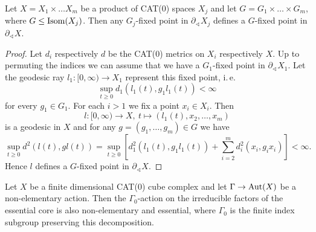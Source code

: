 \begin{lemma}[{\cite[Lemma~2.9]{MR3509968}}]
  \label{lem:2.9}
  Let \(X = X_1 \times \dots X_m\) be a product of CAT(0) spaces \(X_j\) and let \(G = G_1 \times \dots \times G_m\), where \(G \leq \operatorname{Isom}(X_j)\). Then any \(G_j\)-fixed point in \(\partial_\sphericalangle X_j\) defines a \(G\)-fixed point in \(\partial_\sphericalangle X\).
\end{lemma}

\begin{proof}
  Let \(d_i\) respectively \(d\) be the CAT(0) metrics on \(X_i\) respectively \(X\). Up to permuting the indices we can assume that we have a \(G_1\)-fixed point in \(\partial_\sphericalangle X_1\). Let the geodesic ray \(l_1\colon [0,\infty) \to X_1\) represent this fixed point, i.\,e.\
  \[
    \sup_{t \geq 0} d_1(l_1(t), g_1l_1(t)) < \infty
  \]
  for every \(g_1 \in G_1\). For each \(i > 1\) we fix a point \(x_i \in X_i\). Then
  \[
    l\colon [0, \infty) \to X,\ t \mapsto (l_1(t), x_2, \dots, x_m)
  \]
  is a geodesic in \(X\) and for any \(g = (g_1, \dots, g_m) \in G\) we have
  \[
    \sup_{t \geq 0} d^2(l(t), gl(t)) = \sup_{t \geq 0} \left [ d_1^2(l_1(t), g_1l_1(t)) + \sum_{i=2}^m d_i^2(x_i, g_ix_i)\right] < \infty.
  \]
  Hence \(l\) defines a \(G\)-fixed point in \(\partial_\sphericalangle X\).
\end{proof}

\begin{lemma}[{\cite[Lemma~2.28]{MR3509968}}]
  \label{lem:2.28}
  Let \(X\) be a finite dimensional CAT(0) cube complex and let \(\Gamma \to \operatorname{Aut}(X)\) be a non-elementary action. Then the \(\Gamma_0\)-action on the irreducible factors of the essential core is also non-elementary and essential, where \(\Gamma_0\) is the finite index subgroup preserving this decomposition.
\end{lemma}

